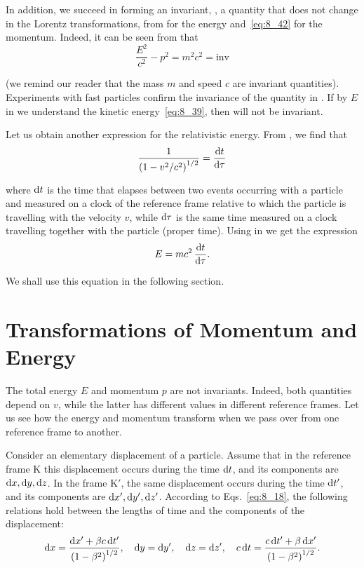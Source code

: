 In addition, we succeed in forming an invariant, \ie, a quantity that does not change in the Lorentz transformations, from  for the energy and~\eqref{eq:8_42} for the momentum. Indeed, it can be seen from  that
\begin{equation}\label{eq:8_45}
	\frac{E^2}{c^2} - p^2 = m^2c^2 = \text{inv}
\end{equation}

\noindent
(we remind our reader that the mass $m$ and speed $c$ are invariant quantities). Experiments with fast particles confirm the invariance of the quantity in . If by $E$ in  we understand the kinetic energy~\eqref{eq:8_39}, then  will not be invariant.

Let us obtain another expression for the relativistic energy. From , we find that
\begin{equation}\label{eq:8_46}
	\frac{1}{\left(1 - v^2/c^2\right)^{1/2}} = \frac{\mathrm{d} t}{\mathrm{d}\tau}
\end{equation}

\noindent
where $\mathrm{d} t$ is the time that elapses between two events occurring with a particle and measured on a clock of the reference frame relative to which the particle is travelling with the velocity $v$, while $\mathrm{d}\tau$ is the same time measured on a clock travelling together with the particle (proper time). Using  in  we get the expression 
\begin{equation}\label{eq:8_47}
	E = mc^2\,\frac{\mathrm{d} t}{\mathrm{d}\tau}.
\end{equation}

\noindent
We shall use this equation in the following section.

\section{Transformations of Momentum and Energy}\label{sec:8_8}

The total energy $E$ and momentum $p$ are not invariants. Indeed, both quantities depend on $v$, while the latter has different values in different reference frames. Let us see how the energy and momentum transform when we pass over from one reference frame to another.

Consider an elementary displacement of a particle. Assume that in the reference frame K this displacement occurs during the time $\mathrm{d} t$, and its components are $\mathrm{d} x, \mathrm{d} y, \mathrm{d} z$. In the frame K$'$, the same displacement occurs during the time $\mathrm{d} t'$, and its components are $\mathrm{d} x', \mathrm{d} y', \mathrm{d} z'$. According to Eqs.~\eqref{eq:8_18}, the following relations hold between the lengths of time and the components of the displacement:
\begin{equation*}
	\mathrm{d} x = \frac{\mathrm{d} x'+\beta c\,\mathrm{d} t'}{\left(1 - \beta^2\right)^{1/2}},\quad \mathrm{d} y=\mathrm{d} y',\quad \mathrm{d} z=\mathrm{d} z',\quad c\,\mathrm{d} t = \frac{c\,\mathrm{d} t'+\beta\,\mathrm{d} x'}{\left(1 - \beta^2\right)^{1/2}}.
\end{equation*}

